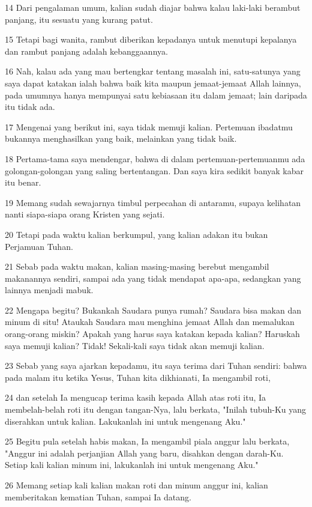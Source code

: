 \par 14 Dari pengalaman umum, kalian sudah diajar bahwa kalau laki-laki berambut panjang, itu sesuatu yang kurang patut.
\par 15 Tetapi bagi wanita, rambut diberikan kepadanya untuk menutupi kepalanya dan rambut panjang adalah kebanggaannya.
\par 16 Nah, kalau ada yang mau bertengkar tentang masalah ini, satu-satunya yang saya dapat katakan ialah bahwa baik kita maupun jemaat-jemaat Allah lainnya, pada umumnya hanya mempunyai satu kebiasaan itu dalam jemaat; lain daripada itu tidak ada.
\par 17 Mengenai yang berikut ini, saya tidak memuji kalian. Pertemuan ibadatmu bukannya menghasilkan yang baik, melainkan yang tidak baik.
\par 18 Pertama-tama saya mendengar, bahwa di dalam pertemuan-pertemuanmu ada golongan-golongan yang saling bertentangan. Dan saya kira sedikit banyak kabar itu benar.
\par 19 Memang sudah sewajarnya timbul perpecahan di antaramu, supaya kelihatan nanti siapa-siapa orang Kristen yang sejati.
\par 20 Tetapi pada waktu kalian berkumpul, yang kalian adakan itu bukan Perjamuan Tuhan.
\par 21 Sebab pada waktu makan, kalian masing-masing berebut mengambil makanannya sendiri, sampai ada yang tidak mendapat apa-apa, sedangkan yang lainnya menjadi mabuk.
\par 22 Mengapa begitu? Bukankah Saudara punya rumah? Saudara bisa makan dan minum di situ! Ataukah Saudara mau menghina jemaat Allah dan memalukan orang-orang miskin? Apakah yang harus saya katakan kepada kalian? Haruskah saya memuji kalian? Tidak! Sekali-kali saya tidak akan memuji kalian.
\par 23 Sebab yang saya ajarkan kepadamu, itu saya terima dari Tuhan sendiri: bahwa pada malam itu ketika Yesus, Tuhan kita dikhianati, Ia mengambil roti,
\par 24 dan setelah Ia mengucap terima kasih kepada Allah atas roti itu, Ia membelah-belah roti itu dengan tangan-Nya, lalu berkata, "Inilah tubuh-Ku yang diserahkan untuk kalian. Lakukanlah ini untuk mengenang Aku."
\par 25 Begitu pula setelah habis makan, Ia mengambil piala anggur lalu berkata, "Anggur ini adalah perjanjian Allah yang baru, disahkan dengan darah-Ku. Setiap kali kalian minum ini, lakukanlah ini untuk mengenang Aku."
\par 26 Memang setiap kali kalian makan roti dan minum anggur ini, kalian memberitakan kematian Tuhan, sampai Ia datang.
